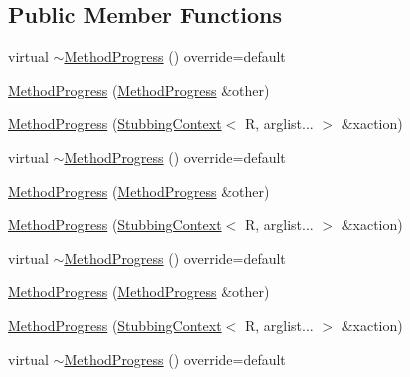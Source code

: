 \subsection*{Public Member Functions}
\begin{DoxyCompactItemize}
\item 
virtual \mbox{\hyperlink{structfakeit_1_1WhenFunctor_1_1MethodProgress_a5bdc18cb6924dc88bc110a15aac37455}{$\sim$\+Method\+Progress}} () override=default
\item 
\mbox{\hyperlink{structfakeit_1_1WhenFunctor_1_1MethodProgress_a1a3992d9bc7c283acb9aa657ab207fc1}{Method\+Progress}} (\mbox{\hyperlink{structfakeit_1_1WhenFunctor_1_1MethodProgress}{Method\+Progress}} \&other)
\item 
\mbox{\hyperlink{structfakeit_1_1WhenFunctor_1_1MethodProgress_ab62da1d9cf787ea91795f61f3b76ac25}{Method\+Progress}} (\mbox{\hyperlink{structfakeit_1_1StubbingContext}{Stubbing\+Context}}$<$ R, arglist... $>$ \&xaction)
\item 
virtual \mbox{\hyperlink{structfakeit_1_1WhenFunctor_1_1MethodProgress_a5bdc18cb6924dc88bc110a15aac37455}{$\sim$\+Method\+Progress}} () override=default
\item 
\mbox{\hyperlink{structfakeit_1_1WhenFunctor_1_1MethodProgress_a1a3992d9bc7c283acb9aa657ab207fc1}{Method\+Progress}} (\mbox{\hyperlink{structfakeit_1_1WhenFunctor_1_1MethodProgress}{Method\+Progress}} \&other)
\item 
\mbox{\hyperlink{structfakeit_1_1WhenFunctor_1_1MethodProgress_ab62da1d9cf787ea91795f61f3b76ac25}{Method\+Progress}} (\mbox{\hyperlink{structfakeit_1_1StubbingContext}{Stubbing\+Context}}$<$ R, arglist... $>$ \&xaction)
\item 
virtual \mbox{\hyperlink{structfakeit_1_1WhenFunctor_1_1MethodProgress_a5bdc18cb6924dc88bc110a15aac37455}{$\sim$\+Method\+Progress}} () override=default
\item 
\mbox{\hyperlink{structfakeit_1_1WhenFunctor_1_1MethodProgress_a1a3992d9bc7c283acb9aa657ab207fc1}{Method\+Progress}} (\mbox{\hyperlink{structfakeit_1_1WhenFunctor_1_1MethodProgress}{Method\+Progress}} \&other)
\item 
\mbox{\hyperlink{structfakeit_1_1WhenFunctor_1_1MethodProgress_ab62da1d9cf787ea91795f61f3b76ac25}{Method\+Progress}} (\mbox{\hyperlink{structfakeit_1_1StubbingContext}{Stubbing\+Context}}$<$ R, arglist... $>$ \&xaction)
\item 
virtual \mbox{\hyperlink{structfakeit_1_1WhenFunctor_1_1MethodProgress_a5bdc18cb6924dc88bc110a15aac37455}{$\sim$\+Method\+Progress}} () override=default

\end{DoxyCompactItemize}
